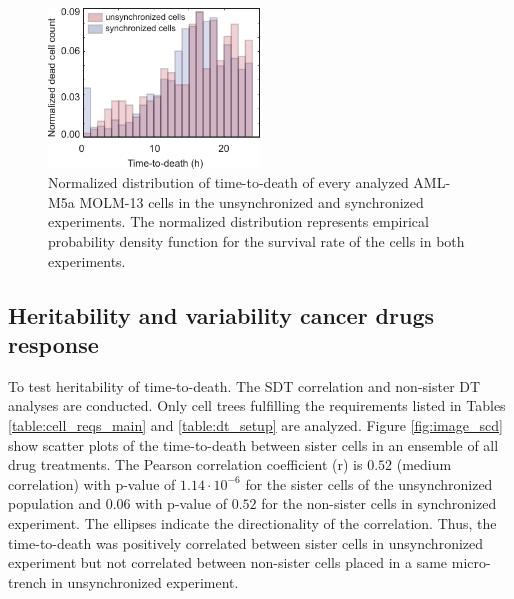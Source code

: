 \documentclass[pdftex,12pt,a4paper]{report}
\begin{document}
\begin{figure}[H]
\centering
\includegraphics[width=0.5\textwidth]{images/death_time/dt.pdf}
\caption{Normalized distribution of time-to-death of every analyzed AML-M5a MOLM-13 cells in the unsynchronized and synchronized experiments. The normalized distribution represents empirical probability density function for the survival rate of the cells in both experiments.}
\label{fig:death_time_comparison}
\end{figure}



\subsection{Heritability and variability cancer drugs response}


To test heritability of time-to-death. The SDT correlation and non-sister DT analyses are conducted. Only cell trees fulfilling the requirements listed in Tables \ref{table:cell_reqs_main} and \ref{table:dt_setup} are analyzed. Figure \ref{fig:image_scd} show scatter plots of the time-to-death between sister cells in an ensemble of all drug treatments. The Pearson correlation coefficient (r) is $0.52$ (medium correlation) with p-value of $1.14 \cdot 10^{-6}$ for the sister cells of the unsynchronized population and $0.06$ with p-value of $0.52$ for the non-sister cells in synchronized experiment. The ellipses indicate the directionality of the correlation. Thus, the time-to-death was positively correlated between sister cells in unsynchronized experiment but not correlated between non-sister cells placed in a same micro-trench in unsynchronized experiment.
\end{document}
